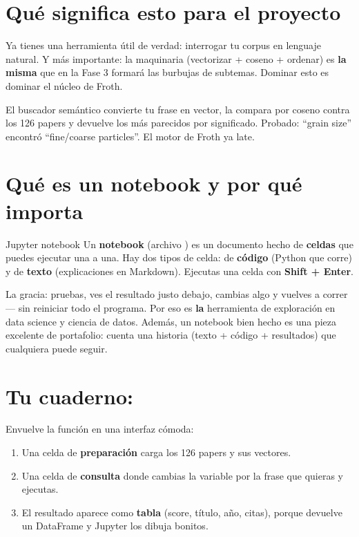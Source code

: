 \documentclass[11pt,a4paper]{article}
\begin{document}
\section{Qué significa esto para el proyecto}

Ya tienes una herramienta útil de verdad: interrogar tu corpus en lenguaje natural. Y más
importante: la maquinaria (vectorizar + coseno + ordenar) es \textbf{la misma} que en la
Fase 3 formará las burbujas de subtemas. Dominar esto es dominar el núcleo de Froth.

\begin{resumen}
El buscador semántico convierte tu frase en vector, la compara por coseno contra los 126
papers y devuelve los más parecidos por significado. Probado: ``grain size'' encontró
``fine/coarse particles''. El motor de Froth ya late.
\end{resumen}
\clearpage
{}
{}

\section{Qué es un notebook y por qué importa}

\begin{concepto}{Jupyter notebook}
Un \textbf{notebook} (archivo ) es un documento hecho de \textbf{celdas} que
puedes ejecutar una a una. Hay dos tipos de celda: de \textbf{código} (Python que corre) y de
\textbf{texto} (explicaciones en Markdown). Ejecutas una celda con \textbf{Shift + Enter}.
\end{concepto}

La gracia: pruebas, ves el resultado justo debajo, cambias algo y vuelves a correr --- sin
reiniciar todo el programa. Por eso es \textbf{la} herramienta de exploración en data science
y ciencia de datos. Además, un notebook bien hecho es una pieza excelente de portafolio:
cuenta una historia (texto + código + resultados) que cualquiera puede seguir.

\section{Tu cuaderno: }

Envuelve la función  en una interfaz cómoda:
\begin{enumerate}
  \item Una celda de \textbf{preparación} carga los 126 papers y sus vectores.
  \item Una celda de \textbf{consulta} donde cambias la variable  por la
        frase que quieras y ejecutas.
  \item El resultado aparece como \textbf{tabla} (score, título, año, citas), porque
         devuelve un DataFrame y Jupyter los dibuja bonitos.
\end{enumerate}
\end{document}
